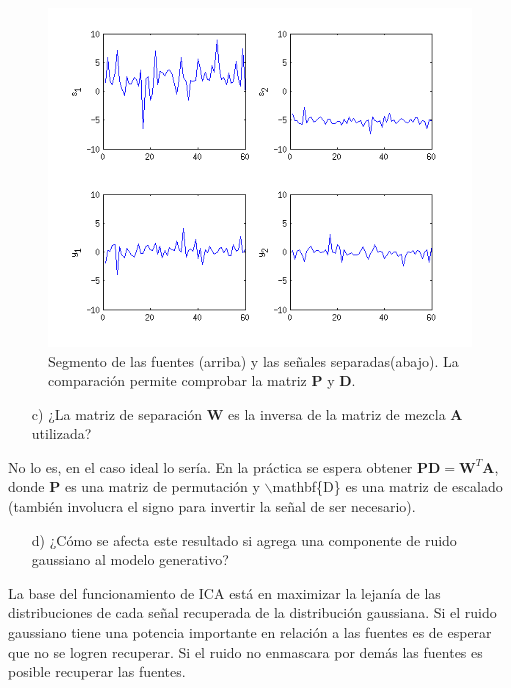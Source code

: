 \documentclass[11pt,a4paper,final]{article}
\begin{document}
\begin{figure}
\includegraphics [width=\textwidth]{Ejercicio4_02.png}
\caption{Segmento de las fuentes (arriba) y las señales separadas(abajo). La comparación permite comprobar la matriz $\mathbf{P}$ y $\mathbf{D}$.}
\label{fig:ejercicio42}
\end{figure}


\begin{enumerate}
   \item[c)] ¿La matriz de separación $\mathbf{W}$ es la inversa de la matriz de mezcla $\mathbf{A}$ utilizada?
\end{enumerate}

No lo es, en el caso ideal lo sería. En la práctica se espera obtener $\mathbf{P} \mathbf{D} = \mathbf{W}^T\mathbf{A}$, donde $\mathbf{P}$ es una matriz de permutación y \ensuremath{\backslash}mathbf\{D\} es una matriz de escalado (también involucra el signo para invertir la señal de ser necesario).

\begin{enumerate}

   \item[d)]  ¿Cómo se afecta este resultado si agrega una componente de ruido gaussiano al modelo generativo?
\end{enumerate}

La base del funcionamiento de ICA está en maximizar la lejanía de las distribuciones de cada señal recuperada de la distribución gaussiana. Si el ruido gaussiano tiene una potencia importante en relación a las fuentes es de esperar que no se logren recuperar. Si el ruido no enmascara por demás las fuentes es posible recuperar las fuentes.
\end{document}
